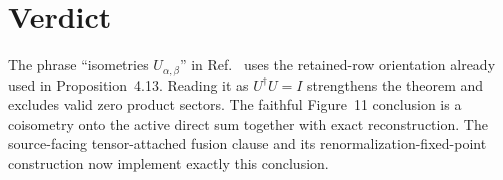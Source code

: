 \documentclass{article}
\begin{document}
\section{Verdict}

The phrase ``isometries $U_{\alpha,\beta}$'' in
Ref.~\cite{Cirac2016MPDO_arXiv} uses the retained-row orientation already used
in Proposition~4.13. Reading it as $U^\dagger U=I$ strengthens the theorem and
excludes valid zero product sectors. The faithful Figure~11 conclusion is a
coisometry onto the active direct sum together with exact reconstruction. The
source-facing tensor-attached fusion clause and its renormalization-fixed-point
construction now implement exactly this conclusion.



\end{document}
